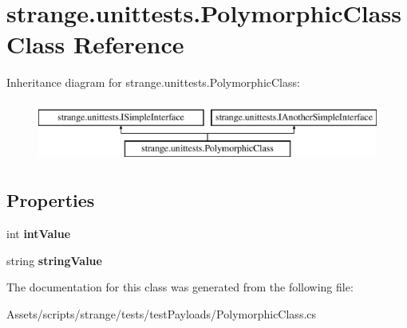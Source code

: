 \hypertarget{classstrange_1_1unittests_1_1_polymorphic_class}{\section{strange.\-unittests.\-Polymorphic\-Class Class Reference}
\label{classstrange_1_1unittests_1_1_polymorphic_class}
}
Inheritance diagram for strange.\-unittests.\-Polymorphic\-Class\-:\begin{figure}[H]
\begin{center}
\leavevmode
\includegraphics[height=2.000000cm]{classstrange_1_1unittests_1_1_polymorphic_class}
\end{center}
\end{figure}
\subsection*{Properties}
\begin{DoxyCompactItemize}
\item 
\hypertarget{classstrange_1_1unittests_1_1_polymorphic_class_a48eef34fac62dc1c3cd41ce865df8dc1}{int {\bfseries int\-Value}}\label{classstrange_1_1unittests_1_1_polymorphic_class_a48eef34fac62dc1c3cd41ce865df8dc1}

\item 
\hypertarget{classstrange_1_1unittests_1_1_polymorphic_class_aae8fbca62fb93959b938df8ab7ebb187}{string {\bfseries string\-Value}}\label{classstrange_1_1unittests_1_1_polymorphic_class_aae8fbca62fb93959b938df8ab7ebb187}

\end{DoxyCompactItemize}


The documentation for this class was generated from the following file\-:\begin{DoxyCompactItemize}
\item 
Assets/scripts/strange/tests/test\-Payloads/Polymorphic\-Class.\-cs\end{DoxyCompactItemize}
